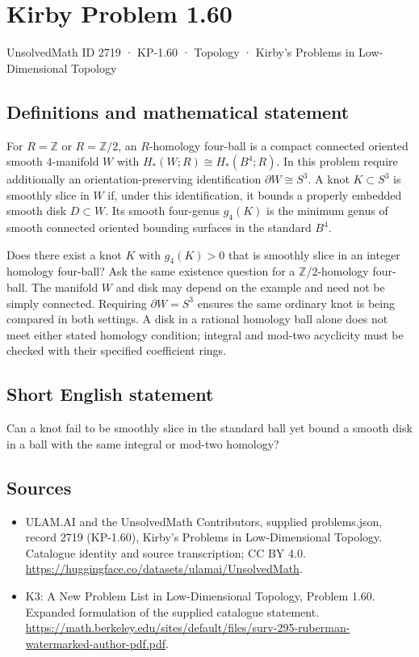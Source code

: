 \documentclass[11pt,a4paper]{article}
\begin{document}
\section*{Kirby Problem 1.60}\label{2719}
{\small UnsolvedMath ID 2719 · KP-1.60 · Topology · Kirby's Problems in Low-Dimensional Topology}
\subsection{Definitions and mathematical statement}
For $R=\mathbb Z$ or $R=\mathbb Z/2$, an $R$-homology four-ball is a compact
connected oriented smooth $4$-manifold $W$ with
$H_*(W;R)\cong H_*(B^4;R)$. In this problem require additionally an
orientation-preserving identification $\partial W\cong S^3$.
A knot $K\subset S^3$ is smoothly slice in $W$ if, under this identification,
it bounds a properly embedded smooth disk $D\subset W$.
Its smooth four-genus $g_4(K)$ is the minimum genus of smooth connected
oriented bounding surfaces in the standard $B^4$.

Does there exist a knot $K$ with $g_4(K)>0$ that is smoothly slice in an
integer homology four-ball? Ask the same existence question for a
$\mathbb Z/2$-homology four-ball.
The manifold $W$ and disk may depend on the example and need not be simply
connected. Requiring $\partial W=S^3$ ensures the same ordinary knot is being
compared in both settings. A disk in a rational homology ball alone does not
meet either stated homology condition; integral and mod-two acyclicity must be
checked with their specified coefficient rings.
\subsection{Short English statement}
Can a knot fail to be smoothly slice in the standard ball yet bound a smooth disk in a ball with the same integral or mod-two homology?
\subsection{Sources}
\begin{itemize}
\item[S1] ULAM.AI and the UnsolvedMath Contributors, supplied problems.json, record 2719 (KP-1.60), Kirby's Problems in Low-Dimensional Topology. Catalogue identity and source transcription; CC BY 4.0.
\url{https://huggingface.co/datasets/ulamai/UnsolvedMath}.
\item[S2] K3: A New Problem List in Low-Dimensional Topology, Problem 1.60. Expanded formulation of the supplied catalogue statement.
\url{https://math.berkeley.edu/sites/default/files/surv-295-ruberman-watermarked-author-pdf.pdf}.
\end{itemize}
\end{document}
